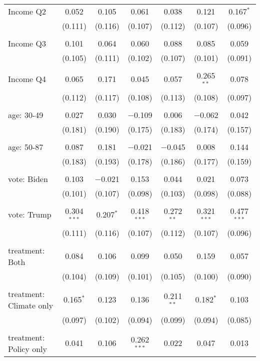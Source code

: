 \begin{tabular}{@{\extracolsep{5pt}}lcccccc}
 Income Q2 & 0.052 & 0.105 & 0.061 & 0.038 & 0.121 & 0.167$^{*}$ \\ 
  & (0.111) & (0.116) & (0.107) & (0.112) & (0.107) & (0.096) \\ 
  & & & & & & \\ 
 Income Q3 & 0.101 & 0.064 & 0.060 & 0.088 & 0.085 & 0.059 \\ 
  & (0.105) & (0.111) & (0.102) & (0.107) & (0.101) & (0.091) \\ 
  & & & & & & \\ 
 Income Q4 & 0.065 & 0.171 & 0.045 & 0.057 & 0.265$^{**}$ & 0.078 \\ 
  & (0.112) & (0.117) & (0.108) & (0.113) & (0.108) & (0.097) \\ 
  & & & & & & \\ 
 age: 30-49 & 0.027 & 0.030 & $-$0.109 & 0.006 & $-$0.062 & 0.042 \\ 
  & (0.181) & (0.190) & (0.175) & (0.183) & (0.174) & (0.157) \\ 
  & & & & & & \\ 
 age: 50-87 & 0.087 & 0.181 & $-$0.021 & $-$0.045 & 0.008 & 0.144 \\ 
  & (0.183) & (0.193) & (0.178) & (0.186) & (0.177) & (0.159) \\ 
  & & & & & & \\ 
 vote: Biden & 0.103 & $-$0.021 & 0.153 & 0.044 & 0.021 & 0.073 \\ 
  & (0.101) & (0.107) & (0.098) & (0.103) & (0.098) & (0.088) \\ 
  & & & & & & \\ 
 vote: Trump & 0.304$^{***}$ & 0.207$^{*}$ & 0.418$^{***}$ & 0.272$^{**}$ & 0.321$^{***}$ & 0.477$^{***}$ \\ 
  & (0.111) & (0.116) & (0.107) & (0.112) & (0.107) & (0.096) \\ 
  & & & & & & \\ 
 treatment: Both & 0.084 & 0.106 & 0.099 & 0.050 & 0.159 & 0.057 \\ 
  & (0.104) & (0.109) & (0.101) & (0.105) & (0.100) & (0.090) \\ 
  & & & & & & \\ 
 treatment: Climate only & 0.165$^{*}$ & 0.123 & 0.136 & 0.211$^{**}$ & 0.182$^{*}$ & 0.103 \\ 
  & (0.097) & (0.102) & (0.094) & (0.099) & (0.094) & (0.085) \\ 
  & & & & & & \\ 
 treatment: Policy only & 0.041 & 0.106 & 0.262$^{***}$ & 0.022 & 0.047 & 0.013 \\ 

\end{tabular}
